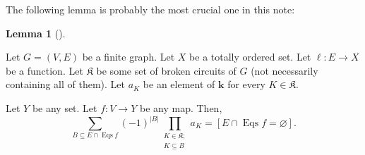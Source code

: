 \documentclass[numbers=enddot,12pt,final,onecolumn,notitlepage]{scrartcl}%
\theoremstyle{definition}
\newtheorem{lem}[theo]{Lemma}
\newenvironment{lemma}[1][]
{\begin{lem}[#1]\begin{leftbar}}
{\end{leftbar}\end{lem}}
\let\sumnonlimits\sum
\let\prodnonlimits\prod
\renewcommand{\sum}{\sumnonlimits\limits}
\renewcommand{\prod}{\prodnonlimits\limits}
\begin{document}
The following lemma is probably the most crucial one in this note:

\begin{lemma}
\label{lem.NBCm.moeb}Let $G=\left(  V,E\right)  $ be a finite graph. Let $X$
be a totally ordered set. Let $\ell:E\rightarrow X$ be a function. Let
$\mathfrak{K}$ be some set of broken circuits of $G$ (not necessarily
containing all of them). Let $a_{K}$ be an element of $\mathbf{k}$ for every
$K\in\mathfrak{K}$.

Let $Y$ be any set. Let $f:V\rightarrow Y$ be any map. Then,%
\[
\sum_{B\subseteq E\cap\operatorname*{Eqs}f}\left(  -1\right)  ^{\left\vert
B\right\vert }\prod_{\substack{K\in\mathfrak{K};\\K\subseteq B}}a_{K}=\left[
E\cap\operatorname*{Eqs}f=\varnothing\right]  .
\]

\end{lemma}
\end{document}
